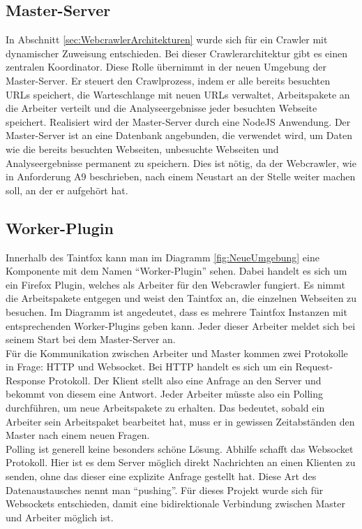 \subsection{Master-Server}
In Abschnitt \ref{sec:WebcrawlerArchitekturen} wurde sich für ein Crawler mit dynamischer Zuweisung entschieden. Bei dieser Crawlerarchitektur gibt es einen zentralen Koordinator. Diese Rolle übernimmt in der neuen Umgebung der Master-Server. Er steuert den Crawlprozess, indem er alle bereits besuchten URLs speichert, die Warteschlange mit neuen URLs verwaltet, Arbeitspakete an die Arbeiter verteilt und die Analyseergebnisse jeder besuchten Webseite speichert. Realisiert wird der Master-Server durch eine NodeJS Anwendung. Der Master-Server ist an eine Datenbank angebunden, die verwendet wird, um Daten wie die bereits besuchten Webseiten, unbesuchte Webseiten und Analyseergebnisse permanent zu speichern. Dies ist nötig, da der Webcrawler, wie in Anforderung A9 beschrieben, nach einem Neustart an der Stelle weiter machen soll, an der er aufgehört hat.
\subsection{Worker-Plugin}
Innerhalb des Taintfox kann man im Diagramm \ref{fig:NeueUmgebung} eine Komponente mit dem Namen \enquote{Worker-Plugin} sehen. Dabei handelt es sich um ein Firefox Plugin, welches als Arbeiter für den Webcrawler fungiert. Es nimmt die Arbeitspakete entgegen und weist den Taintfox an, die einzelnen Webseiten zu besuchen. Im Diagramm ist angedeutet, dass es mehrere Taintfox Instanzen mit entsprechenden Worker-Plugins geben kann. Jeder dieser Arbeiter meldet sich bei seinem Start bei dem Master-Server an. \\
Für die Kommunikation zwischen Arbeiter und Master kommen zwei Protokolle in Frage: HTTP und Websocket. Bei HTTP handelt es sich um ein Request-Response Protokoll. Der Klient stellt also eine Anfrage an den Server und bekommt von diesem eine Antwort. Jeder Arbeiter müsste also ein Polling durchführen, um neue Arbeitspakete zu erhalten. Das bedeutet, sobald ein Arbeiter sein Arbeitspaket bearbeitet hat, muss er in gewissen Zeitabständen den Master nach einem neuen Fragen. \\
Polling ist generell keine besonders schöne Lösung. Abhilfe schafft das Websocket Protokoll. Hier ist es dem Server möglich direkt Nachrichten an einen Klienten zu senden, ohne das dieser eine explizite Anfrage gestellt hat. Diese Art des Datenaustausches nennt man \enquote{pushing}. Für dieses Projekt wurde sich für Websockets entschieden, damit eine bidirektionale Verbindung zwischen Master und Arbeiter möglich ist.\\
